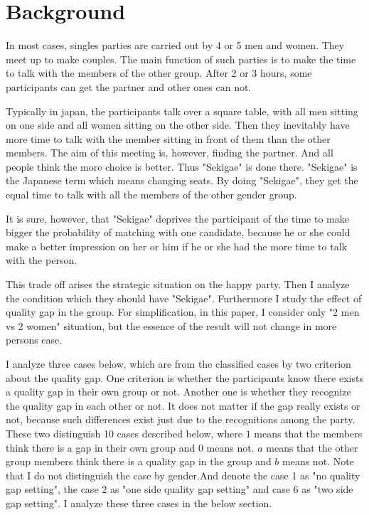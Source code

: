 \documentclass{article}
\begin{document}
\section{Background}
\par
In most cases, singles parties are carried out by 4 or 5 men and women. They meet up to make couples. The main function of such parties is to make the time to talk with the members of the other group. After 2 or 3 hours, some participants can get the partner and other ones can not. 
\par
Typically in japan, the participants talk over a square table, with all men sitting on one side and all women sitting on the other side. Then they inevitably have more time to talk with the member sitting in front of them than the other members. The aim of this meeting is, however, finding the partner. And all people think the more choice is better. Thus "Sekigae" is done there. "Sekigae" is the Japanese term which means changing seats. By doing "Sekigae", they get the equal time to talk with all the members of the other gender group.
\par
It is sure, however, that "Sekigae" deprives the participant of the time to make bigger the probability of matching with one candidate, because he or she could make a better impression on her or him if he or she had the more time to talk with the person.
\par
This trade off arises the strategic situation on the happy party. Then I analyze the condition which they should have "Sekigae". Furthermore I study the effect of quality gap in the group. For simplification, in this paper, I consider only "2 men vs 2 women" situation, but the essence of the result will not change in more persons case. 
\par
I analyze three cases below, which are from the classified cases by two criterion about the quality gap. One criterion is whether the participants know there exists a quality gap in their own group or not. Another one is whether they recognize the quality gap in each other or not. It does not matter if the gap really exists or not, because such differences exist just due to the recognitions among the party. These two distinguish 10 cases described below, where $1$ means that the members think there is a gap in their own group and $0$ means not. $a$ means that the other group members think there is a quality gap in the group and $b$ means not. Note that I do not distinguish the case by gender.And denote the case 1 as "no quality gap setting", the case 2 as "one side quality gap setting" and case 6 as "two side gap setting". I analyze these three cases in the below section. 
\end{document}
